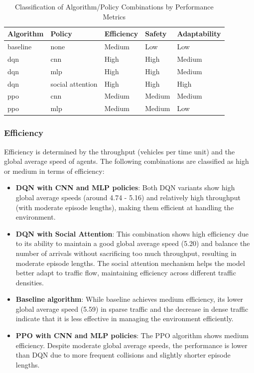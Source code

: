 \begin{table}[h!]
\centering
\begin{tabular}{|l|l|l|l|l|}
\hline
\textbf{Algorithm} & \textbf{Policy} & \textbf{Efficiency} & \textbf{Safety} & \textbf{Adaptability} \\ \hline
baseline           & none            & Medium          & Low              & Low            \\ \hline
dqn                & cnn             & High            & High             & Medium         \\ \hline
dqn                & mlp             & High            & High             & Medium         \\ \hline
dqn                & social attention & High            & High             & High           \\ \hline
ppo                & cnn             & Medium          & Medium           & Medium         \\ \hline
ppo                & mlp             & Medium          & Medium           & Low            \\ \hline
\end{tabular}
\caption{Classification of Algorithm/Policy Combinations by Performance Metrics}
\label{table:classification}
\end{table}

\subsubsection{Efficiency}
Efficiency is determined by the throughput (vehicles per time unit) and the global average speed of agents. The following combinations are classified as high or medium in terms of efficiency:
\begin{itemize}
    \item \textbf{DQN with CNN and MLP policies}: Both DQN variants show high global average speeds (around 4.74 - 5.16) and relatively high throughput (with moderate episode lengths), making them efficient at handling the environment.
    \item \textbf{DQN with Social Attention}: This combination shows high efficiency due to its ability to maintain a good global average speed (5.20) and balance the number of arrivals without sacrificing too much throughput, resulting in moderate episode lengths. The social attention mechanism helps the model better adapt to traffic flow, maintaining efficiency across different traffic densities.
    \item \textbf{Baseline algorithm}: While baseline achieves medium efficiency, its lower global average speed (5.59) in sparse traffic and the decrease in dense traffic indicate that it is less effective in managing the environment efficiently.
    \item \textbf{PPO with CNN and MLP policies}: The PPO algorithm shows medium efficiency. Despite moderate global average speeds, the performance is lower than DQN due to more frequent collisions and slightly shorter episode lengths.
\end{itemize}

